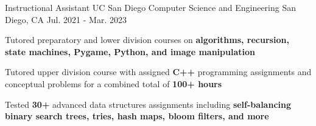 \begin{cventries}
  \cventry
    {Instructional Assistant}
    {UC San Diego Computer Science and Engineering} %
    {San Diego, CA} %
    {Jul. 2021 - Mar. 2023}
    {
      \begin{cvitems}
        \item {Tutored preparatory and lower division courses on \textbf{algorithms, recursion, state machines, Pygame, Python, and image manipulation}}
        \item {Tutored upper division course with assigned \textbf{C++} programming assignments and conceptual problems for a combined total of \textbf{100+ hours}}
        \item {Tested \textbf{30+} advanced data structures assignments including \textbf{self-balancing binary search trees, tries, hash maps, bloom filters, and more}}
      \end{cvitems}
    }



\end{cventries}
